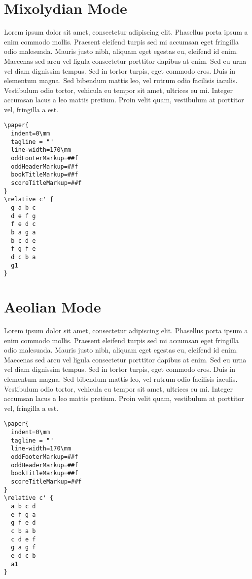 \documentclass[11pt]{article}
\begin{document}
\section*{Mixolydian Mode}
\label{sec:org653fd1b}

Lorem ipsum dolor sit amet, consectetur adipiscing elit. Phasellus
porta ipsum a enim commodo mollis. Praesent eleifend turpis sed mi
accumsan eget fringilla odio malesuada. Mauris justo nibh, aliquam
eget egestas eu, eleifend id enim. Maecenas sed arcu vel ligula
consectetur porttitor dapibus at enim. Sed eu urna vel diam dignissim
tempus. Sed in tortor turpis, eget commodo eros. Duis in elementum
magna. Sed bibendum mattis leo, vel rutrum odio facilisis iaculis.
Vestibulum odio tortor, vehicula eu tempor sit amet, ultrices eu mi.
Integer accumsan lacus a leo mattis pretium. Proin velit quam,
vestibulum at porttitor vel, fringilla a est.

\begin{verbatim}
\paper{
  indent=0\mm
  tagline = ""
  line-width=170\mm
  oddFooterMarkup=##f
  oddHeaderMarkup=##f
  bookTitleMarkup=##f
  scoreTitleMarkup=##f
}
\relative c' {
  g a b c
  d e f g
  f e d c
  b a g a
  b c d e
  f g f e
  d c b a
  g1
}
\end{verbatim}

\section*{Aeolian Mode}
\label{sec:org4d5fb97}

Lorem ipsum dolor sit amet, consectetur adipiscing elit. Phasellus
porta ipsum a enim commodo mollis. Praesent eleifend turpis sed mi
accumsan eget fringilla odio malesuada. Mauris justo nibh, aliquam
eget egestas eu, eleifend id enim. Maecenas sed arcu vel ligula
consectetur porttitor dapibus at enim. Sed eu urna vel diam dignissim
tempus. Sed in tortor turpis, eget commodo eros. Duis in elementum
magna. Sed bibendum mattis leo, vel rutrum odio facilisis iaculis.
Vestibulum odio tortor, vehicula eu tempor sit amet, ultrices eu mi.
Integer accumsan lacus a leo mattis pretium. Proin velit quam,
vestibulum at porttitor vel, fringilla a est.

\begin{verbatim}
\paper{
  indent=0\mm
  tagline = ""
  line-width=170\mm
  oddFooterMarkup=##f
  oddHeaderMarkup=##f
  bookTitleMarkup=##f
  scoreTitleMarkup=##f
}
\relative c' {
  a b c d
  e f g a
  g f e d
  c b a b
  c d e f
  g a g f
  e d c b
  a1
}
\end{verbatim}
\end{document}
